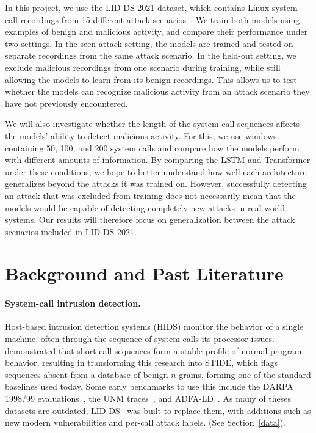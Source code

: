 \documentclass{article}
\begin{document}
In this project, we use the LID-DS-2021 dataset, which contains Linux system-call recordings from 15 different attack scenarios~\citep{grimmer2023lidds2021}. We train both models using examples of benign and malicious activity, and compare their performance under two settings. In the seen-attack setting, the models are trained and tested on separate recordings from the same attack scenario. In the held-out setting, we exclude malicious recordings from one scenario during training, while still allowing the models to learn from its benign recordings. This allows us to test whether the models can recognize malicious activity from an attack scenario they have not previously encountered.

We will also investigate whether the length of the system-call sequences affects the models' ability to detect malicious activity. For this, we use windows containing 50, 100, and 200 system calls and compare how the models perform with different amounts of information. By comparing the LSTM and Transformer under these conditions, we hope to better understand how well each architecture generalizes beyond the attacks it was trained on. However, successfully detecting an attack that was excluded from training does not necessarily mean that the models would be capable of detecting completely new attacks in real-world systems. Our results will therefore focus on generalization between the attack scenarios included in LID-DS-2021.


\section{Background and Past Literature}
\label{past-literature}
\paragraph{System-call intrusion detection.} Host-based intrusion detection systems (HIDS) monitor the behavior of a single machine, often through the sequence of system calls its processor issues. \citet{forrest1996unm} demonstrated that short call sequences form a stable profile of normal program behavior, resulting in \citet{hofmeyr1998stide} transforming this research into STIDE, which flags sequences absent from a database of benign $n$-grams, forming one of the standard baselines used today. Some early benchmarks to use this include the DARPA 1998/99 evaluations~\citep{lippmann2000darpa98,lippmann2000darpa99}, the UNM traces~\citep{forrest1996unm}, and ADFA-LD~\citep{creech2013adfald}. As many of theses datasets are outdated, LID-DS~\citep{grimmer2019lidds, grimmer2023lidds2021} was built to replace them, with additions such as new modern vulnerabilities and per-call attack labels. (See Section~\ref{data}).
\end{document}

